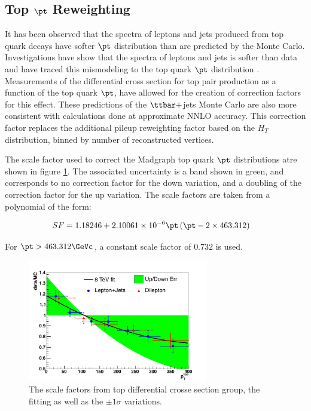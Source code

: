 \subsection{Top $\pt$ Reweighting}
\label{top_pt_reweighting_overview}

\par It has been observed that the spectra of leptons and jets
produced from top quark decays have softer $\pt$ distribution than are
predicted by the Monte Carlo.  Investigations have show that the \PT
spectra of leptons and jets is softer than data and have traced this
mismodeling to the top quark $\pt$ distribution
\cite{CMS-PAS-TOP-12-028, CMS-PAS-TOP-12-027}.  Measurements of the
differential cross section for top pair production as a function of
the top quark $\pt$, have allowed for the creation of correction
factors for this effect.  These predictions of the $\ttbar+$jets Monte
Carlo are also more consistent with calculations done at approximate
NNLO accuracy.  This correction factor replaces the additional pileup
reweighting factor based on the $H_{T}$ distribution, binned by number
of reconstructed vertices.  

\par The scale factor used to correct the Madgraph top quark $\pt$
distributions atre shown in figure \ref{fig:topptsys}.  The associated
uncertainty is a band shown in green, and corresponds to no correction
factor for the down variation, and a doubling of the correction factor
for the up variation.  The scale factors are taken from a polynomial
of the form:

\begin{align*}
SF &= 1.18246 + 2.10061\times 10^{-6} \pt \left(\pt - 2 \times 463.312 \right)
\end{align*}

\noindent For $\pt > 463.312 \GeVc$, a constant scale factor of $0.732$ is used.


\begin{figure}[hbtp]
 \begin{center}
   \includegraphics[width=0.7\textwidth]{Figures/Analysis_2_Diagrams/topptsys.pdf}
   \caption{The scale factors from top differential crosse section
     group, the fitting as well as the $\pm1\sigma$
     variations.}
   \label{fig:topptsys}
   \end{center}
\end{figure}


